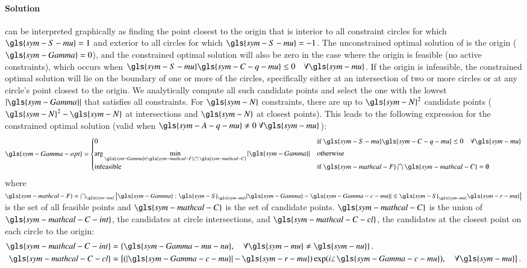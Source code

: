 \paragraph{Solution}
 can be interpreted graphically as finding the point closest to the origin that is interior to all constraint circles for which $\gls{sym-S-mu}=1$ and exterior to all circles for which $\gls{sym-S-mu}=-1$.
The unconstrained optimal solution of  is the origin ($\gls{sym-Gamma}=0$), and the constrained optimal solution will also be zero in the case where the origin is feasible (no active constraints), which occurs when $ \gls{sym-S-mu} \gls{sym-C-q-mu} \leq 0 \quad \forall \gls{sym-mu}$.
If the origin is \textrm{infeasible}, the constrained optimal solution will lie on the boundary of one or more of the circles, specifically either at an intersection of two or more circles or at any circle's point closest to the origin.
We analytically compute all such candidate points and select the one with the lowest $|\gls{sym-Gamma}|$ that satisfies all constraints.
For $\gls{sym-N}$ constraints, there are up to $\gls{sym-N}^2$ candidate points ($\gls{sym-N}^2-\gls{sym-N}$ at intersections and $\gls{sym-N}$ at closest points).
This leads to the following expression for the constrained optimal solution (valid when $\gls{sym-A-q-mu} \neq 0 ~\forall \gls{sym-mu}$):
\begin{equation}\label{eq:gamma-opt-quadratic}
\gls{sym-Gamma-opt} =
\begin{cases}
 0 & \textrm{if } \gls{sym-S-mu} \gls{sym-C-q-mu} \leq 0 \quad \forall \gls{sym-mu} \\[3pt]
 \arg\min\limits_{\gls{sym-Gamma} \in \gls{sym-mathcal-F} \bigcap \gls{sym-mathcal-C}} |\gls{sym-Gamma}|
 & \textrm{otherwise} \\[3pt]
 \textrm{infeasible} & \textrm{if } \gls{sym-mathcal-F} \bigcap \gls{sym-mathcal-C} = \emptyset
\end{cases}
\end{equation}
where $\gls{sym-mathcal-F} = \bigcap_{\gls{sym-mu}} \left\{\gls{sym-Gamma}: \gls{sym-S}_{\gls{sym-mu}}|\gls{sym-Gamma} - \gls{sym-Gamma-c-mu}| \le \gls{sym-S}_{\gls{sym-mu}} \gls{sym-r-mu} \right\}$ is the set of all feasible points and $\gls{sym-mathcal-C}$ is the set of candidate points. $\gls{sym-mathcal-C}$ is the union of $\gls{sym-mathcal-C-int}$, the candidates at circle intersections, and $\gls{sym-mathcal-C-cl}$, the candidates at the closest point on each circle to the origin:
\begin{equation}\label{eq:candidate-points}
\begin{aligned}
\gls{sym-mathcal-C-int} &= \left\{
    \gls{sym-Gamma-mu-nu}, \quad \forall \gls{sym-mu} \neq \gls{sym-nu}
\right\}.
\\
\gls{sym-mathcal-C-cl} &= \left\{
    (|\gls{sym-Gamma-c-mu}| - \gls{sym-r-mu})\exp (i\angle\,\gls{sym-Gamma-c-mu}), \quad \forall \gls{sym-mu}
\right\}.
\end{aligned}
\end{equation}
